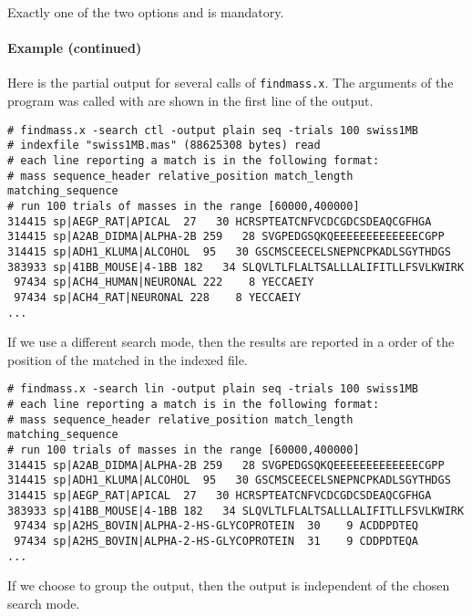 \documentclass[12pt]{article}
\newcommand{\Showfile}[1]{{\small \texttt{#1}}}
\begin{document}
Exactly one of the two options  and 
 is mandatory.

\paragraph{Example (continued)}
Here is the partial output for several calls of \Showfile{findmass.x}. 
The arguments of the program was called with are shown in the first line 
of the output.

\begin{footnotesize}
\begin{verbatim}
# findmass.x -search ctl -output plain seq -trials 100 swiss1MB
# indexfile "swiss1MB.mas" (88625308 bytes) read
# each line reporting a match is in the following format:
# mass sequence_header relative_position match_length matching_sequence
# run 100 trials of masses in the range [60000,400000]
314415 sp|AEGP_RAT|APICAL  27   30 HCRSPTEATCNFVCDCGDCSDEAQCGFHGA
314415 sp|A2AB_DIDMA|ALPHA-2B 259   28 SVGPEDGSQKQEEEEEEEEEEEEECGPP
314415 sp|ADH1_KLUMA|ALCOHOL  95   30 GSCMSCEECELSNEPNCPKADLSGYTHDGS
383933 sp|41BB_MOUSE|4-1BB 182   34 SLQVLTLFLALTSALLLALIFITLLFSVLKWIRK
 97434 sp|ACH4_HUMAN|NEURONAL 222    8 YECCAEIY
 97434 sp|ACH4_RAT|NEURONAL 228    8 YECCAEIY
...
\end{verbatim}
\end{footnotesize}

If we use a different search mode, then the results are reported in a 
order of the position of the matched in the indexed file.

\begin{footnotesize}
\begin{verbatim}
# findmass.x -search lin -output plain seq -trials 100 swiss1MB
# each line reporting a match is in the following format:
# mass sequence_header relative_position match_length matching_sequence
# run 100 trials of masses in the range [60000,400000]
314415 sp|A2AB_DIDMA|ALPHA-2B 259   28 SVGPEDGSQKQEEEEEEEEEEEEECGPP
314415 sp|ADH1_KLUMA|ALCOHOL  95   30 GSCMSCEECELSNEPNCPKADLSGYTHDGS
314415 sp|AEGP_RAT|APICAL  27   30 HCRSPTEATCNFVCDCGDCSDEAQCGFHGA
383933 sp|41BB_MOUSE|4-1BB 182   34 SLQVLTLFLALTSALLLALIFITLLFSVLKWIRK
 97434 sp|A2HS_BOVIN|ALPHA-2-HS-GLYCOPROTEIN  30    9 ACDDPDTEQ
 97434 sp|A2HS_BOVIN|ALPHA-2-HS-GLYCOPROTEIN  31    9 CDDPDTEQA
...
\end{verbatim}
\end{footnotesize}

If we choose to group the output, then the output is independent of
the chosen search mode.
\end{document}
